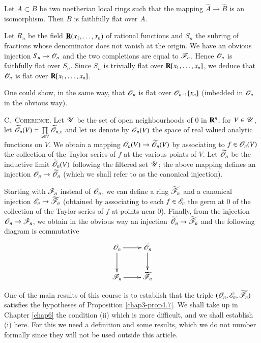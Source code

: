 \begin{proposition}\label{chap3-prop4.10}
Let $A\subset B$ be two noetherian local rings such that the mapping $\widehat{A}\to \widehat{B}$ is an isomorphism. Then $B$ is faithfully flat over $A$.
\end{proposition}

\begin{example}\label{chap3-exam4.11}
Let $R_{n}$ be the field $\mathbf{R}(x_{1},\ldots,x_{n})$ of rational functions and $S_{n}$ the subring of fractions whose denominator does not vanish at the origin. We have an obvious injection $S_{n}\to \mathscr{O}_{n}$ and the two completions are equal to $\mathscr{F}_{n}$. Hence $\mathscr{O}_{n}$ is faithfully flat over $S_{n}$. Since $S_{n}$ is trivially flat over $\mathbf{R}[x_{1},\ldots,x_{n}]$, we deduce that $\mathscr{O}_{n}$ is flat over $\mathbf{R}[x_{1},\ldots,x_{n}]$.
\end{example}

One could show, in the same way, that $\mathscr{O}_{n}$ is flat over $\mathscr{O}_{n-1}[x_{n}]$ (imbedded in $\mathscr{O}_{n}$ in the obvious way).

C.~\textsc{Coherence.} Let $\mathscr{U}$ be the set of open neighbourhoods of $0$ in $\mathbf{R}^{n}$; for $V\in \mathscr{U}$, let $\widetilde{\mathscr{O}}_{n}(V)=\prod\limits_{x\in V}\widetilde{\mathscr{O}}_{n,x}$ and let us denote by $\mathscr{O}_{n}(V)$ the space of real valued analytic functions on $V$. We obtain a mapping $\mathscr{O}_{n}(V)\to \widetilde{\mathscr{O}}_{n}(V)$ by associating to $f\in \mathscr{O}_{n}(V)$ the collection of the Taylor series of $f$ at the various points of $V$. Let $\widetilde{\mathscr{O}}_{n}$ be the inductive limit $\widetilde{\mathscr{O}}_{n}(V)$ following the filtered set $\mathscr{U}$; the above mapping defines an injection $\mathscr{O}_{n}\to \widetilde{\mathscr{O}}_{n}$ (which we shall refer to as the canonical injection).

Starting with $\mathscr{F}_{n}$ instead of $\mathscr{O}_{n}$, we can define a ring $\widetilde{\mathscr{F}}_{n}$ and a canonical injection $\mathscr{E}_{n}\to \widetilde{\mathscr{F}}_{n}$ (obtained by associating to each $f\in \mathscr{E}_{n}$ the germ at $0$ of the collection of the Taylor series of $f$ at points near $0$). Finally, from the injection $\mathscr{O}_{n}\to \mathscr{F}_{n}$, we obtain in the obvious way an injection $\widetilde{\mathscr{O}}_{n}\to \widetilde{\mathscr{F}}_{n}$ and the following diagram is commutative
\[
\xymatrix{
\scrO_{n}\ar[d]\ar[r] & \widetilde{\scrO}_{n}\ar[d]\\
\scrF_{n}\ar[r] & \widetilde{\scrF}_{n}
}
\]

One of the main results of this course is to establish that the triple $(\mathscr{O}_{n},\mathscr{E}_{n},\widetilde{\mathscr{F}}_{n})$ satisfies the hypotheses of Proposition \ref{chap3-prop4.7}. We shall take up in Chapter \ref{chap6} the condition (ii) which is more difficult, and we shall establish (i) here. For this we need a definition and some results, which we do not number formally since they will not be used outside this article.


